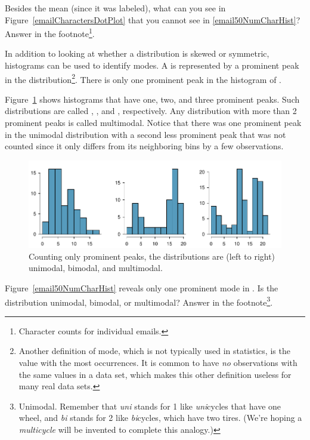 \begin{exercise}
Besides the mean (since it was labeled), what can you see in Figure~\ref{emailCharactersDotPlot} that you cannot see in \ref{email50NumCharHist}? Answer in the footnote\footnote{Character counts for individual emails.}.
\end{exercise}

In addition to looking at whether a distribution is skewed or symmetric, histograms can be used to identify modes. A  is represented by a prominent peak in the distribution\footnote{Another definition of mode, which is not typically used in statistics, is the value with the most occurrences. It is common to have \emph{no} observations with the same values in a data set, which makes this other definition useless for many real data sets.}. There is only one prominent peak in the histogram of .

Figure~\ref{singleBiMultiModalPlots} shows histograms that have one, two, and three prominent peaks. Such distributions are called , , and , respectively. Any distribution with more than 2 prominent peaks is called multimodal. Notice that there was one prominent peak in the unimodal distribution with a second less prominent peak that was not counted since it only differs from its neighboring bins by a few observations.
\begin{figure}[h]
   \centering
   \includegraphics[width=\textwidth]{01/figures/singleBiMultiModalPlots/singleBiMultiModalPlots}
   \caption{Counting only prominent peaks, the distributions are (left to right) unimodal, bimodal, and multimodal.}
   \label{singleBiMultiModalPlots}
\end{figure}

\begin{exercise}
Figure~\ref{email50NumCharHist} reveals only one prominent mode in . Is the distribution unimodal, bimodal, or multimodal? Answer in the footnote\footnote{Unimodal. Remember that \emph{uni} stands for 1 like \emph{uni}cycles that have one wheel, and \emph{bi} stands for 2 like \emph{bi}cycles, which have two tires. (We're hoping a \emph{multicycle} will be invented to complete this analogy.)}.
\end{exercise}


